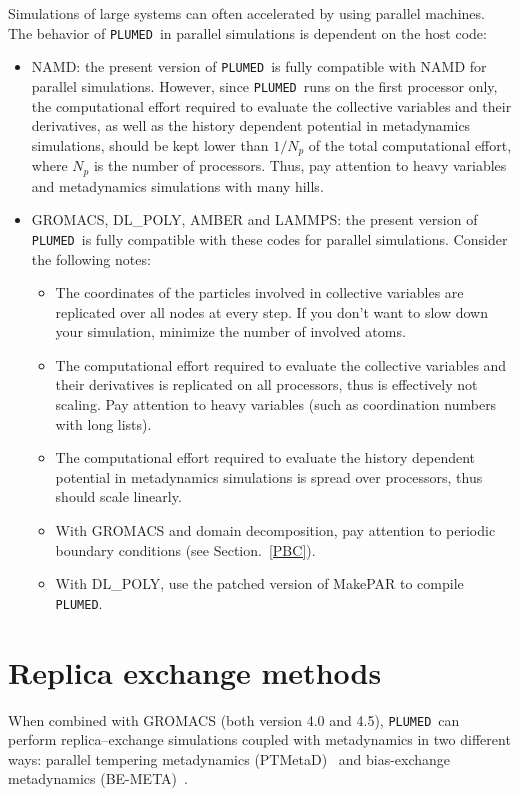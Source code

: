 \documentclass[12pt,fleqn]{report}
\newcommand{\plumed}{{\tt PLUMED}}
\begin{document}
Simulations of large systems can often accelerated by using parallel machines.
The behavior of \plumed \ in parallel simulations is dependent on the host code:
\begin{itemize}
\item NAMD: the present version of \plumed \ is fully compatible with NAMD for parallel simulations. However, since
\plumed \ runs on the first processor only, the computational effort required to evaluate the collective variables and their
derivatives, as well as the history dependent potential in metadynamics simulations, should be kept
lower than $1/N_p$ of the total computational effort, where $N_p$ is the number of processors.
Thus, pay attention to heavy variables and metadynamics simulations with many hills.
\item GROMACS, DL\_POLY, AMBER and LAMMPS: the present version of \plumed \  is fully compatible with these codes for parallel simulations.
Consider the following notes:
\begin{itemize}
\item The coordinates of the particles involved in collective variables are replicated over all nodes
at every step. If you don't want to slow down your simulation, minimize the number of involved atoms.
\item The computational effort required to evaluate the collective variables and their
derivatives is replicated on all processors, thus is effectively not scaling. Pay attention to
heavy variables (such as coordination numbers with long lists).
\item The computational effort required to evaluate the history dependent potential
in metadynamics simulations is spread over processors, thus should scale linearly.
\item With GROMACS and domain decomposition, pay attention to periodic boundary conditions (see Section.~\ref{PBC}).
\item With DL\_POLY, use the patched version of MakePAR to compile \plumed.
\end{itemize}
\end{itemize}

\section{Replica exchange methods}

When combined with GROMACS (both version 4.0 and 4.5), \plumed \  can perform replica--exchange
simulations coupled with metadynamics in two different ways:
parallel tempering metadynamics (PTMetaD)~\cite{bussi_xc,camilloni_protG} and
bias-exchange metadynamics (BE-META)~\cite{piana}.
\end{document}
